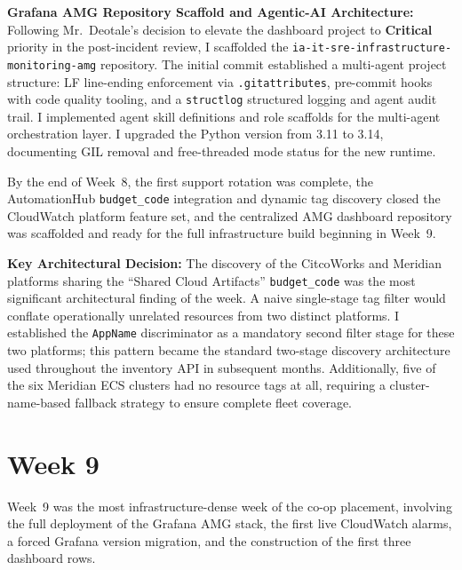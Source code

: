 \textbf{Grafana AMG Repository Scaffold and Agentic-AI Architecture:} 
Following Mr.\ Deotale's decision to elevate the dashboard project to
\textbf{Critical} priority in the post-incident review, I scaffolded the \texttt{ia-it-sre-infrastructure-monitoring-amg}
repository. The initial commit established a multi-agent project
structure: LF line-ending enforcement via \texttt{.gitattributes},
pre-commit hooks with code quality tooling, and a \texttt{structlog}
structured logging and agent audit trail. I implemented
agent skill definitions and role scaffolds for the multi-agent
orchestration layer. I upgraded the Python version from
3.11 to 3.14, documenting GIL removal and free-threaded mode status for the new
runtime.

By the end of Week~8, the first support rotation was complete,
the AutomationHub \texttt{budget\_code} integration and dynamic tag discovery closed the CloudWatch platform feature set,
and the centralized AMG dashboard repository was scaffolded and ready for the full
infrastructure build beginning in Week~9.

\textbf{Key Architectural Decision:} 
The discovery of the CitcoWorks
and Meridian platforms sharing the ``Shared Cloud Artifacts''
\texttt{budget\_code} was the most significant architectural finding of the week.
A naive single-stage tag filter would conflate operationally unrelated
resources from two distinct platforms. I established the \texttt{AppName} discriminator
as a mandatory second filter stage for these two platforms;
this pattern became the standard two-stage discovery architecture used
throughout the inventory API in subsequent months. Additionally, five of
the six Meridian ECS clusters had no resource tags at all, requiring a
cluster-name-based fallback strategy to ensure complete fleet coverage.


\FloatBarrier

\section{Week 9}
\label{sec:week9}

Week~9 was the most infrastructure-dense week of the co-op placement,
involving the full deployment of the Grafana AMG stack, the first
live CloudWatch alarms, a forced Grafana version migration, and the
construction of the first three dashboard rows.

